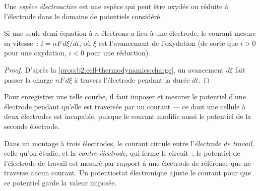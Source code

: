 \begin{definition}\label{def:b2:current-potential-curves:electroactive}
Une \emph{espèce électroactive} est une espèce
qui peut être oxydée ou réduite à l'électrode dans le domaine de potentiels
considéré.
\end{definition}

\begin{proposition}\label{prop:b2:current-potential-curves:current-rate}
Si une seule demi-équation à $n$ électrons a lieu à une électrode, le
courant mesure sa vitesse~: $i = nF\,d\xi/dt$, où $\xi$ est l'avancement de
l'oxydation (de sorte que $i > 0$ pour une oxydation, $i < 0$ pour une réduction).
\end{proposition}

\begin{proof}
D'après la \cref{prop:b2:cell-thermodynamics:charge}, un avancement $d\xi$ fait passer la
charge $nF\,d\xi$ à travers l'électrode pendant la durée $dt$.
\end{proof}

Pour enregistrer une telle courbe, il faut imposer et mesurer le potentiel d'une électrode
pendant qu'elle est traversée par un courant --- ce dont une cellule à deux électrodes
est incapable, puisque le courant modifie aussi le potentiel de la seconde
électrode.

\begin{definition}\label{def:b2:current-potential-curves:set-up}
Dans un montage à trois électrodes, le courant circule entre l'\emph{électrode
de travail}, celle qu'on étudie, et la \emph{contre-électrode},
qui ferme le circuit~; le potentiel
de l'électrode de travail est mesuré par rapport à une électrode de référence que ne traverse
aucun courant. Un potentiostat électronique ajuste le courant pour
que ce potentiel garde la valeur imposée.
\end{definition}


